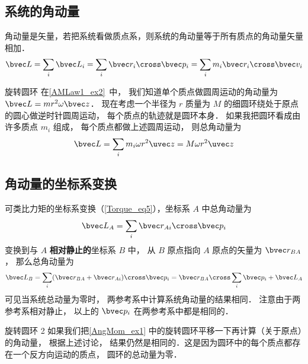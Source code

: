 

\subsection{系统的角动量}
角动量是矢量，若把系统看做质点系，则系统的角动量等于所有质点的角动量矢量相加．
\begin{equation}\label{AngMom_eq1}
\bvec L = \sum_i \bvec L_i = \sum_i \bvec r_i \cross\bvec p_i = \sum_i m_i \bvec r_i \cross\bvec v_i
\end{equation}
\begin{example}{旋转圆环}\label{AngMom_ex1}
在\autoref{AMLaw1_ex2}~中， 我们知道单个质点做圆周运动的角动量为 $\bvec L = m r^2 \omega \bvec z$． 现在考虑一个半径为 $r$ 质量为 $M$ 的细圆环绕处于原点的圆心做逆时针圆周运动， 每个质点的轨迹就是圆环本身． 如果我把圆环看成由许多质点 $m_i$ 组成， 每个质点都做上述圆周运动， 则总角动量为
\begin{equation}
\bvec L = \sum_i m_i \omega r^2 \uvec z = M \omega r^2 \uvec z
\end{equation}
\end{example}

\subsection{角动量的坐标系变换}
可类比力矩的坐标系变换（\autoref{Torque_eq5}），坐标系 $A$ 中总角动量为
\begin{equation}
\bvec L_A = \sum_i \bvec r_{Ai} \cross \bvec p_i 
\end{equation}
变换到与 $A$ \textbf{相对静止的}坐标系 $B$ 中， 从 $B$ 原点指向 $A$ 原点的矢量为 $\bvec r_{BA}$， 那么总角动量为
\begin{equation}\label{AngMom_eq4}
\bvec L_B = \sum_i (\bvec r_{BA} + \bvec r_{Ai})\cross \bvec p_i = \bvec r_{BA}\cross \sum_i \bvec p_i + \bvec L_A
\end{equation}
可见当系统总动量为零时， 两参考系中计算系统角动量的结果相同． 注意由于两参考系相对静止， 以上的 $\bvec p_i$ 在两参考系中都是相同的．

\begin{example}{旋转圆环 2}\label{AngMom_ex2}
如果我们把\autoref{AngMom_ex1} 中的旋转圆环平移一下再计算（关于原点）的角动量， 根据上述讨论， 结果仍然是相同的．这是因为圆环中的每个质点都存在一个反方向运动的质点， 圆环的总动量为零．
\end{example}

